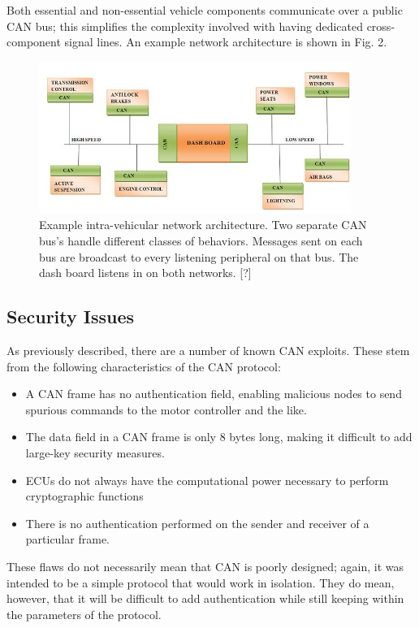 \documentclass{article}
\begin{document}
    Both essential and non-essential vehicle components communicate over a public CAN bus; this simplifies the complexity involved with having dedicated cross-component signal lines. An example network architecture is shown in Fig. 2.

\begin{figure}[h]
  \centering
  \includegraphics[width=4in]{car-network}
  \caption {Example intra-vehicular network architecture. Two separate CAN bus's handle different classes of behaviors. Messages sent on each bus are broadcast to every listening peripheral on that bus. The dash board listens in on both networks. [?]}
\end{figure}
    
    
    
    
  \subsection{Security Issues}
  As previously described, there are a number of known CAN exploits. These stem from the following characteristics of the CAN protocol:
  \begin{itemize}
    \item A CAN frame has no authentication field, enabling malicious nodes to send spurious commands to the motor controller and the like.
    \item The data field in a CAN frame is only 8 bytes long, making it difficult to add large-key security measures.
    \item ECUs do not always have the computational power necessary to perform cryptographic functions
    \item There is no authentication performed on the sender and receiver of a particular frame.
  \end{itemize}
  These flaws do not necessarily mean that CAN is poorly designed; again, it was intended to be a simple protocol that would work in isolation. They do mean, however, that it will be difficult to add authentication while still keeping within the parameters of the protocol.
\end{document}
